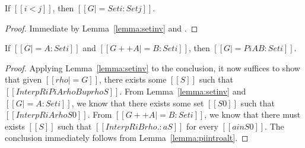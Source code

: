 \documentclass[acmsmall,screen=true,
\ifpublic review=false\else,review=true\fi
  ,anonymous=\ifanonymous true\else false\fi]{acmart}
\newcommand{\scw}[1]{}
\begin{document}





\begin{lemma}[ST-Set]
  \label{lemma:stset}
  If $[[i < j]]$, then $[[G |= Set i : Set j]]$.
\end{lemma}
\begin{proof}
  Immediate by Lemma~\ref{lemma:setinv} and .
\end{proof}

\begin{lemma}[ST-Pi]
  \label{lemma:stpi}
  If $[[G |= A : Set i]]$ and $[[G ++ A |= B : Set i]]$, then $[[G |= Pi
  A B : Set i]]$.
\end{lemma}
\begin{proof}
  Applying Lemma~\ref{lemma:setinv} to the
  conclusion, it now suffices to show that given $[[rho |= G]]$, there
  exists some $[[S]]$ such that $[[InterpR i Pi A{rho} B{up rho} S]]$.
  From Lemma~\ref{lemma:setinv} and $[[G |= A : Set i]]$, we know that
  there exists some set $[[S0]]$ such that $[[InterpR i A {rho} S0]]$.
From $[[G ++ A |= B : Set i]]$, we know that there must
exists $[[S]]$ such that $[[InterpR i B {rho .: a} S]]$ for every $[[a
in S0]]$. The conclusion immediately follows from Lemma~\ref{lemma:piintroalt}.
\end{proof}
\end{document}

